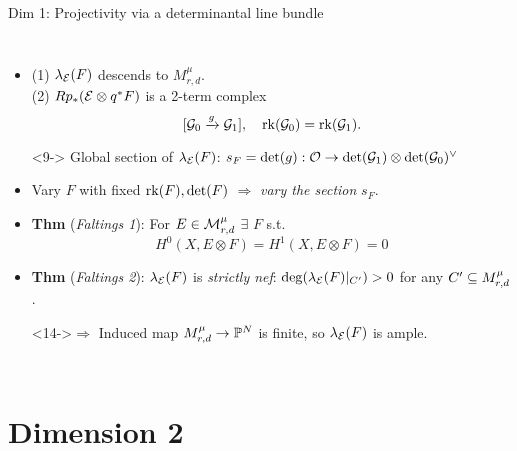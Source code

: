 \documentclass[8pt]{beamer} %
\begin{document}
\begin{frame}[fragile]{Dim 1: Projectivity via a determinantal line bundle}
\begin{columns}[t]
    \begin{itemize}
        \item<8-> (1) $\lambda_{\mathcal{E}}(F)$ descends to $M^\mu_{r,d}$. \\ (2) $R p_* (\mathcal{E} \otimes q^*F)$ is a 2-term complex
        \[ [\mathcal{G}_0 \xrightarrow{g} \mathcal{G}_1], \quad \operatorname{\mathrm{rk}}(\mathcal{G}_0) = \operatorname{\mathrm{rk}}(\mathcal{G}_1). \]
        \item[]<9-> Global section of $\lambda_{\mathcal{E}}(F)$: $s_F = \det(g): \mathcal{O} \to \det(\mathcal{G}_1) \otimes \det(\mathcal{G}_0)^\vee$
        \item<10-> Vary $F$ with fixed $\operatorname{\mathrm{rk}}(F), \det(F)$ $\Rightarrow$ \textit{vary the section} $s_F$.
        \item<11-> \textbf{Thm} (\textit{Faltings 1}): For $E \in \mathcal{M}^\mu_{r,d}$ $\exists$ $F$ s.t.
        \[ H^0(X, E \otimes F) = H^1(X, E \otimes F) = 0 \]
        \item<13-> \textbf{Thm} (\textit{Faltings 2}): $\lambda_{\mathcal{E}}(F)$ is \textit{strictly nef}: $\deg(\lambda_{\mathcal{E}}(F)|_{C'}) > 0$ for any $C' \subseteq M^\mu_{r,d}$.
        \item[]<14->$\Rightarrow$ Induced map $M^\mu_{r,d} \to \mathbb{P}^N$ is finite, so $\lambda_{\mathcal{E}}(F)$ is ample.
    \end{itemize}
\end{columns}
\end{frame}

\section{Dimension 2}
\end{document}
